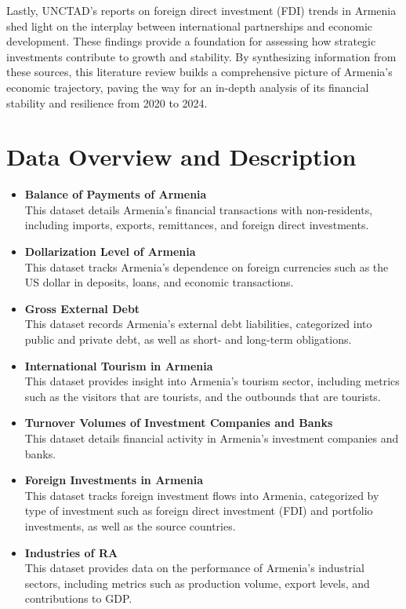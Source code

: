 \documentclass[
]{article}
\begin{document}
Lastly, UNCTAD's reports on foreign direct investment (FDI) trends in
Armenia shed light on the interplay between international partnerships
and economic development. These findings provide a foundation for
assessing how strategic investments contribute to growth and stability.
By synthesizing information from these sources, this literature review
builds a comprehensive picture of Armenia's economic trajectory, paving
the way for an in-depth analysis of its financial stability and
resilience from 2020 to 2024.

\section{Data Overview and
Description}\label{data-overview-and-description}

\begin{itemize}
\item
  \textbf{Balance of Payments of Armenia}\\
  This dataset details Armenia's financial transactions with
  non-residents, including imports, exports, remittances, and foreign
  direct investments.
\item
  \textbf{Dollarization Level of Armenia}\\
  This dataset tracks Armenia's dependence on foreign currencies such as
  the US dollar in deposits, loans, and economic transactions.
\item
  \textbf{Gross External Debt}\\
  This dataset records Armenia's external debt liabilities, categorized
  into public and private debt, as well as short- and long-term
  obligations.
\item
  \textbf{International Tourism in Armenia}\\
  This dataset provides insight into Armenia's tourism sector, including
  metrics such as the visitors that are tourists, and the outbounds that
  are tourists.
\item
  \textbf{Turnover Volumes of Investment Companies and Banks}\\
  This dataset details financial activity in Armenia's investment
  companies and banks.
\item
  \textbf{Foreign Investments in Armenia}\\
  This dataset tracks foreign investment flows into Armenia, categorized
  by type of investment such as foreign direct investment (FDI) and
  portfolio investments, as well as the source countries.
\item
  \textbf{Industries of RA}\\
  This dataset provides data on the performance of Armenia's industrial
  sectors, including metrics such as production volume, export levels,
  and contributions to GDP.
\end{itemize}
\end{document}
